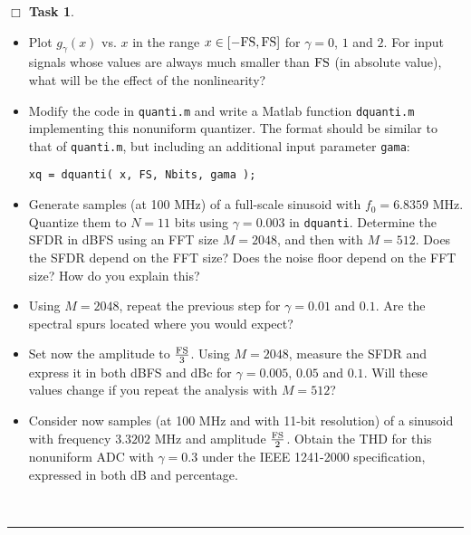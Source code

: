 \documentclass[11pt]{article}
\newcounter{ntask}
\newtheorem{task}[ntask]{$\Box$ Task}
\newenvironment{Task}
{\begin{task}\end{task} \vspace{-0.1in}\sf}
{\hfill \QED}
\def\QED{~\rule[-1pt]{5pt}{5pt}\par\medskip}
\begin{document}
\begin{Task}

\begin{itemize}

\item Plot $g_\gamma(x)$ vs. $x$ in the range $x\in [-{\rm FS},{\rm FS}]$ for $\gamma = 0$, $1$ and $2$. For input signals whose values are always much smaller than $\rm FS$ (in absolute value), what will be the effect of the nonlinearity?

\item Modify the code in {\tt quanti.m} and write a Matlab function {\tt dquanti.m} implementing this nonuniform quantizer. The format should be similar to that of {\tt quanti.m}, but including an additional input parameter {\tt gama}:
\begin{center}
{\tt xq = dquanti( x, FS, Nbits, gama ); }
\end{center} 
\item Generate  samples (at 100 MHz) of a full-scale sinusoid with $f_0 = 6.8359$ MHz.
Quantize them to $N=11$ bits using $\gamma = 0.003$ in {\tt dquanti}. 
Determine the SFDR in dBFS using an FFT size $M=2048$, and then with $M=512$. 
Does the SFDR depend on the FFT size? Does the noise floor depend on the FFT size? How do you explain this?

\item Using $M=2048$, repeat the previous step for $\gamma = 0.01$ and $0.1$. Are the spectral spurs located where you would expect?

\item Set now the amplitude to $\frac{\rm FS}{3}$. Using $M=2048$, measure the SFDR and express it in both dBFS and dBc for $\gamma=0.005$, $0.05$ and $0.1$. Will these values change if you repeat the analysis with $M=512$?

\item Consider now samples (at 100 MHz and with 11-bit resolution) of a sinusoid with frequency $3.3202$ MHz and amplitude $\frac{\rm FS}{2}$. Obtain the THD for this nonuniform ADC with $\gamma = 0.3$ under the IEEE 1241-2000 specification, expressed in both dB and percentage.

\end{itemize}
\vspace*{-0.5cm}
\end{Task}
\end{document}
